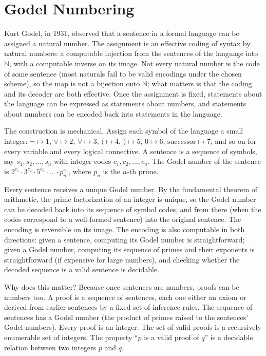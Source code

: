 \section{Godel Numbering}
\label{se:godel-numbering}

Kurt Godel, in 1931, observed that a sentence in a formal language can be
assigned a natural number. The assignment is an effective coding of
syntax by natural numbers: a computable injection from the
sentences of the language into $\mathbb{N}$, with a computable inverse
on its image. Not every natural number is the code of some sentence
(most naturals fail to be valid encodings under the chosen scheme),
so the map is not a bijection onto $\mathbb{N}$; what matters is that
the coding and its decoder are both effective. Once the assignment is
fixed, statements about the language can be expressed as statements
about numbers, and statements about numbers can be encoded back into
statements in the language.

The construction is mechanical. Assign each symbol of the language a small
integer: $\neg \mapsto 1$, $\vee \mapsto 2$, $\forall \mapsto 3$,
$( \mapsto 4$, $) \mapsto 5$, $0 \mapsto 6$, $\textrm{successor} \mapsto 7$,
and so on for every variable and every logical connective. A sentence is a
sequence of symbols, say $s_1, s_2, \ldots, s_n$ with integer codes $c_1,
c_2, \ldots, c_n$. The Godel number of the sentence is
$2^{c_1} \cdot 3^{c_2} \cdot 5^{c_3} \cdot \ldots \cdot p_n^{c_n}$, where
$p_n$ is the $n$-th prime.

Every sentence receives a unique Godel number. By the fundamental theorem of
arithmetic, the prime factorization of an integer is unique, so the Godel
number can be decoded back into its sequence of symbol codes, and from there
(when the codes correspond to a well-formed sentence) into the original
sentence. The encoding is reversible on its image. The encoding is also
computable in both directions: given a sentence, computing its Godel number is
straightforward; given a Godel number, computing its sequence of primes and
their exponents is straightforward (if expensive for large numbers), and
checking whether the decoded sequence is a valid sentence is decidable.

Why does this matter? Because once sentences are numbers, proofs can be
numbers too. A proof is a sequence of sentences, each one either an axiom or
derived from earlier sentences by a fixed set of inference rules. The
sequence of sentences has a Godel number (the product of primes raised to the
sentences' Godel numbers). Every proof is an integer. The set of valid proofs
is a recursively enumerable set of integers. The property ``$p$ is a valid
proof of $q$'' is a decidable relation between two integers $p$ and $q$.

